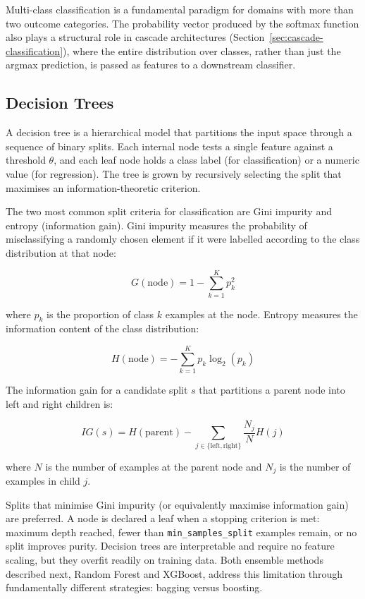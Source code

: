 \documentclass[10pt,a4paper]{article}
\begin{document}
Multi-class classification is a fundamental paradigm for domains with more than two outcome categories. The probability vector produced by the softmax function also plays a structural role in cascade architectures (Section~\ref{sec:cascade-classification}), where the entire distribution over classes, rather than just the argmax prediction, is passed as features to a downstream classifier.

\subsection{Decision Trees}
\label{sec:decision-trees}

A decision tree is a hierarchical model that partitions the input space through a sequence of binary splits. Each internal node tests a single feature against a threshold $\theta$, and each leaf node holds a class label (for classification) or a numeric value (for regression). The tree is grown by recursively selecting the split that maximises an information-theoretic criterion.

The two most common split criteria for classification are Gini impurity and entropy (information gain). Gini impurity measures the probability of misclassifying a randomly chosen element if it were labelled according to the class distribution at that node:

\begin{equation}
G(\text{node}) = 1 - \sum_{k=1}^{K} p_k^2
\label{eq:gini}
\end{equation}

where $p_k$ is the proportion of class $k$ examples at the node. Entropy measures the information content of the class distribution:

\begin{equation}
H(\text{node}) = -\sum_{k=1}^{K} p_k \log_2(p_k)
\label{eq:entropy}
\end{equation}

The information gain for a candidate split $s$ that partitions a parent node into left and right children is:

\begin{equation}
IG(s) = H(\text{parent}) - \sum_{j \in \{\text{left}, \text{right}\}} \frac{N_j}{N} H(j)
\label{eq:info-gain}
\end{equation}

where $N$ is the number of examples at the parent node and $N_j$ is the number of examples in child $j$.

Splits that minimise Gini impurity (or equivalently maximise information gain) are preferred. A node is declared a leaf when a stopping criterion is met: maximum depth reached, fewer than \texttt{min\_samples\_split} examples remain, or no split improves purity. Decision trees are interpretable and require no feature scaling, but they overfit readily on training data. Both ensemble methods described next, Random Forest and XGBoost, address this limitation through fundamentally different strategies: bagging versus boosting.
\end{document}
